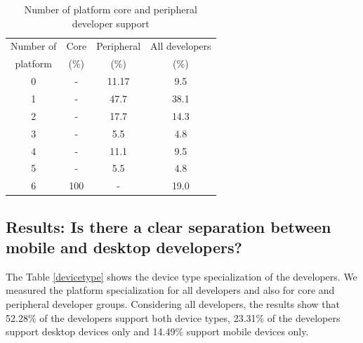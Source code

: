 \documentclass[10pt, conference]{IEEEtran}
\begin{document}

\begin{table}[h]
\renewcommand{\arraystretch}{1.3}
\caption{Number of platform core and peripheral developer support}
\label{plat}
\centering
\begin{tabular}{|c|c|c|c|}
\hline
Number of  & Core  & Peripheral  & All developers\\
	platform		& (\%)		&   (\%) 	&	(\%)	\\				
\hline
0 &   - &   11.17	& 9.5\\
\hline
1 &   - &   47.7	& 38.1\\
\hline
2 &   -&    17.7	&	14.3\\
\hline
3 &   - &   5.5	&	4.8\\
\hline
4 &   - &   11.1	&	9.5\\
\hline
5 &   - &   5.5 	& 4.8\\
\hline
6 &   100 &   -  	&	19.0\\
\hline
\end{tabular}
\end{table} 






\subsection{Results: Is there a clear separation between mobile and desktop developers?}

The Table \ref{devicetype} shows the device type specialization of the  developers. We measured the platform specialization for all developers and also for core and peripheral developer groups. Considering all developers, the results show that 52.28\%  of the developers support both device types, 23.31\% of the developers support desktop devices only and 14.49\% support mobile devices only.
\end{document}
